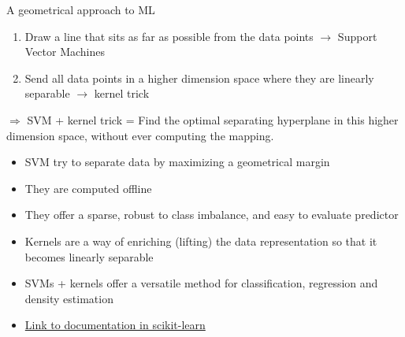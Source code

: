 \documentclass{beamer}
\begin{document}
\begin{frame}{A geometrical approach to ML}
\begin{block}{}
\begin{enumerate}
\item Draw a line that sits as far as possible from the data points $\rightarrow$ Support Vector Machines
\item Send all data points in a higher dimension space where they are linearly separable $\rightarrow$ kernel trick
\end{enumerate}
$\Rightarrow$ SVM + kernel trick = Find the optimal separating hyperplane in this higher dimension space, without ever computing the mapping.
\end{block}

\begin{itemize}
\item SVM try to separate data by maximizing a geometrical margin
\item They are computed offline
\item They offer a sparse, robust to class imbalance, and easy to evaluate predictor
\item Kernels are a way of enriching (lifting) the data representation so that it becomes linearly separable
\item SVMs + kernels offer a versatile method for classification, regression and density estimation
\item \href{http://scikit-learn.org/stable/modules/svm.html}{Link to documentation in scikit-learn}
\end{itemize}

\end{frame}
\end{document}
